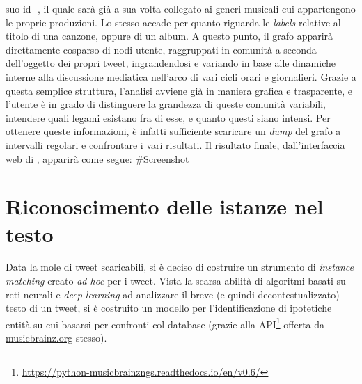 \documentclass[12pt, a4paper, twocolumn]{article} %
\begin{document}
suo id -, il quale sarà già a sua volta collegato ai generi musicali cui appartengono le proprie produzioni. Lo stesso accade per quanto riguarda le \textit{labels} relative al titolo di una canzone, oppure di un album. A questo punto, il grafo apparirà direttamente cosparso di nodi utente, raggruppati in comunità a seconda dell'oggetto dei propri tweet, ingrandendosi e variando in base alle dinamiche interne alla discussione mediatica nell'arco di vari cicli orari e giornalieri. Grazie a questa semplice struttura, l'analisi avviene già in maniera grafica e trasparente, e l'utente è in grado di distinguere la grandezza di queste comunità variabili, intendere quali legami esistano fra di esse, e quanto questi siano intensi. Per ottenere queste informazioni, è infatti sufficiente scaricare un \textit{dump} del grafo a intervalli regolari e confrontare i vari risultati. Il risultato finale, dall'interfaccia web di , apparirà come segue:
#Screenshot

\section{Riconoscimento delle istanze nel testo}
Data la mole di tweet scaricabili, si è deciso di costruire un strumento di \textit{instance matching} creato \textit{ad hoc} per i tweet.
Vista la scarsa abilità di algoritmi basati su reti neurali e \textit{deep learning} ad analizzare il breve (e quindi decontestualizzato) testo di un tweet, si è costruito un modello per l'identificazione di ipotetiche entità su cui basarsi per confronti col database (grazie alla API\footnote{\url{https://python-musicbrainzngs.readthedocs.io/en/v0.6/}} offerta da \url{musicbrainz.org} stesso).
\end{document}
